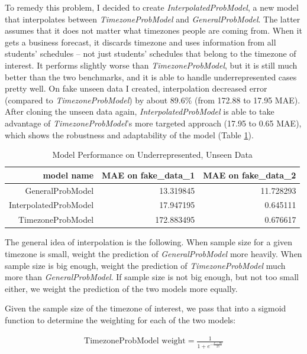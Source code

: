 \documentclass[oneside]{article}
\begin{document}
To remedy this problem, I decided to create \emph{InterpolatedProbModel}, a new
model that interpolates between \emph{TimezoneProbModel} and
\emph{GeneralProbModel}. The latter assumes that it does not matter what
timezones people are coming from. When it gets a business forecast, it discards
timezone and uses information from all students' schedules -- not just
students' schedules that belong to the timezone of interest. It performs
slightly worse than \emph{TimezoneProbModel}, but it is still much better than
the two benchmarks, and it is able to handle underrepresented cases pretty
well. On fake unseen data I created, interpolation decreased error (compared to
\emph{TimezoneProbModel}) by about 89.6\% (from 172.88 to 17.95 MAE). After
cloning the unseen data again, \emph{InterpolatedProbModel} is able to take
advantage of \emph{TimezoneProbModel}'s more targeted approach (17.95 to 0.65
MAE), which shows the robustness and adaptability of the model (Table
\ref{tab:model_perf_underrepresented}).

\begin{table}[]
  \centering
  \caption{Model Performance on Underrepresented, Unseen Data}
  \label{tab:model_perf_underrepresented}
  \begin{tabular}{rrr}
    \textbf{model name} & \textbf{MAE on fake\_data\_1} & \textbf{MAE on fake\_data\_2} \\
    \hline
    GeneralProbModel & 13.319845 & 11.728293 \\
    InterpolatedProbModel & 17.947195 & 0.645111 \\
    TimezoneProbModel & 172.883495 & 0.676617 \\
    \hline
  \end{tabular}
\end{table}





The general idea of interpolation is the following.  When sample size for a
given timezone is small, weight the prediction of \emph{GeneralProbModel} more
heavily. When sample size is big enough, weight the prediction of
\emph{TimezoneProbModel} much more than \emph{GeneralProbModel}. If sample size
is not big enough, but not too small either, we weight the prediction of the
two models more equally.

Given the sample size of the timezone of interest, we pass that into a sigmoid
function to determine the weighting for each of the two models:

\begin{align}
  \text{TimezoneProbModel weight} = \frac{1}{1+e^{-\frac{x-80}{25}}}
\end{align}
\end{document}

